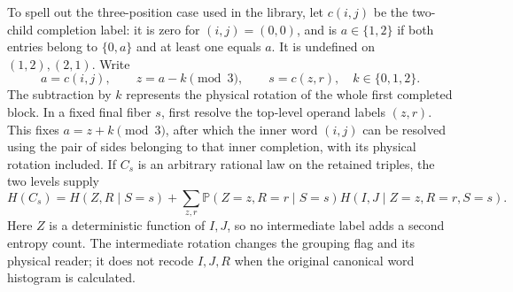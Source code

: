 \documentclass[11pt]{article}
\numberwithin{equation}{section}
\theoremstyle{definition}
\theoremstyle{remark}
\begin{document}
To spell out the three-position case used in the library, let \(c(i,j)\)
be the two-child completion label: it is zero for \((i,j)=(0,0)\), and
is \(a\in\{1,2\}\) if both entries belong to \(\{0,a\}\) and at
least one equals \(a\).  It is undefined on \((1,2),(2,1)\).  Write
\[
 a=c(i,j),\qquad z=a-k\pmod3,\qquad s=c(z,r),
 \quad k\in\{0,1,2\}.
\]
The subtraction by \(k\) represents the physical rotation of the whole
first completed block.  In a fixed final fiber \(s\), first resolve the
top-level operand labels \((z,r)\).  This fixes \(a=z+k\pmod3\),
after which the inner word \((i,j)\) can be resolved using the pair of
sides belonging to that inner completion, with its physical rotation
included.  If \(C_s\) is an arbitrary rational law on the retained
triples, the two levels supply
\begin{equation}
 H(C_s)=H(Z,R\mid S=s)
       +\sum_{z,r}\mathbb P(Z=z,R=r\mid S=s)
                      H(I,J\mid Z=z,R=r,S=s).
 \label{alg:nested-completion-entropy}
\end{equation}
Here \(Z\) is a deterministic function of \(I,J\), so no intermediate
label adds a second entropy count.  The intermediate rotation changes
the grouping flag and its physical reader; it does not recode \(I,J,R\)
when the original canonical word histogram is calculated.
\end{document}
